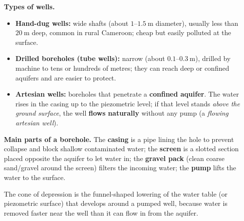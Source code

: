 \documentclass[11pt]{article}
\newcommand{\cle}[1]{{\popxbold\color{popdark}#1}}
\begin{document}
\textbf{Types of wells.}
\begin{itemize}
\item \textbf{Hand-dug wells:} wide shafts (about $1$–$1.5\ \mathrm{m}$ diameter), usually less than $20\ \mathrm{m}$ deep, common in rural Cameroon; cheap but easily polluted at the surface.
\item \textbf{Drilled boreholes (tube wells):} narrow (about $0.1$–$0.3\ \mathrm{m}$), drilled by machine to tens or hundreds of metres; they can reach deep or confined aquifers and are easier to protect.
\item \textbf{Artesian wells:} boreholes that penetrate a \textbf{confined aquifer}. The water rises in the casing up to the piezometric level; if that level stands \emph{above the ground surface}, the well \textbf{flows naturally} without any pump (a \emph{flowing artesian well}).
\end{itemize}

\textbf{Main parts of a borehole.} The \textbf{casing} is a pipe lining the hole to prevent collapse and block shallow contaminated water; the \textbf{screen} is a slotted section placed opposite the aquifer to let water in; the \textbf{gravel pack} (clean coarse sand/gravel around the screen) filters the incoming water; the \textbf{pump} lifts the water to the surface.

\begin{definition}
The \cle{cone of depression} is the funnel-shaped lowering of the water table (or piezometric surface) that develops around a pumped well, because water is removed faster near the well than it can flow in from the aquifer.
\end{definition}
\end{document}

